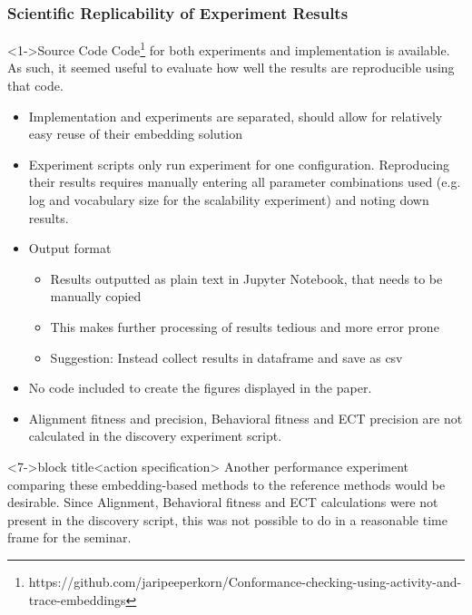 \documentclass{beamer}
\newcommand{\pro}{\item[\color{green}\textbf{+}\color{black}]}
\newcommand{\con}{\item[\color{red}\boldmath{$-$}\color{black}]}
\begin{document}
	\begin{frame}
		\frametitle{Scientific Replicability of Experiment Results}
		\begin{block}<1->{Source Code}
				 Code\footnote{https://github.com/jaripeeperkorn/Conformance-checking-using-activity-and-trace-embeddings} for both experiments and implementation is available. As such, it seemed useful to evaluate how well the results are reproducible using that code.
		\end{block}
		\begin{itemize}
			 \pro<2-> Implementation and experiments are separated, should allow for relatively easy reuse of their embedding solution
			 \con<3-> Experiment scripts only run experiment for one configuration. Reproducing their results requires manually entering all parameter combinations used (e.g. log and vocabulary size for the scalability experiment) and noting down results.
			 \con<4-> Output format
			 \begin{itemize}
			 	\item<4-> Results outputted as plain text in Jupyter Notebook, that needs to be manually copied
			 	\item<4-> This makes further processing of results tedious and more error prone
			 	\item<4-> Suggestion: Instead collect results in dataframe and save as csv
			 \end{itemize}
			 \con<5-> No code included to create the figures displayed in the paper.
			 \con<6-> Alignment fitness and precision, Behavioral fitness and ECT precision are not calculated in the discovery experiment script.
		\end{itemize}
	\begin{alertblock}<7->{block title}<action specification>
		Another performance experiment comparing these embedding-based methods to the reference methods would be desirable. Since Alignment, Behavioral fitness and ECT calculations were not present in the discovery script, this was not possible to do in a reasonable time frame for the seminar.
	\end{alertblock}
	\end{frame}
	
\end{document}
